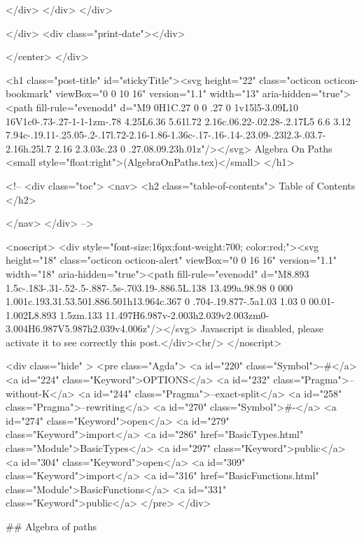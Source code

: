                 </div>
            </div>
          </div>
          
          
        </div>
        <div class="print-date"></div>
        
        
    </center>
  </div>

  

  <h1 class="post-title" id="stickyTitle"><svg height="22" class="octicon octicon-bookmark" viewBox="0 0 10 16" version="1.1" width="13" aria-hidden="true"><path fill-rule="evenodd" d="M9 0H1C.27 0 0 .27 0 1v15l5-3.09L10 16V1c0-.73-.27-1-1-1zm-.78 4.25L6.36 5.61l.72 2.16c.06.22-.02.28-.2.17L5 6.6 3.12 7.94c-.19.11-.25.05-.2-.17l.72-2.16-1.86-1.36c-.17-.16-.14-.23.09-.23l2.3-.03.7-2.16h.25l.7 2.16 2.3.03c.23 0 .27.08.09.23h.01z"/></svg> Algebra On Paths <small style="float:right">(AlgebraOnPaths.tex)</small>
  </h1>

  <!-- 
  <div class="toc">
    <nav>
    <h2 class="table-of-contents"> Table of Contents </h2>
      

    </nav>
  </div>
   -->

  <noscript>
  <div style="font-size:16px;font-weight:700; color:red;"><svg height="18" class="octicon octicon-alert" viewBox="0 0 16 16" version="1.1" width="18" aria-hidden="true"><path fill-rule="evenodd" d="M8.893 1.5c-.183-.31-.52-.5-.887-.5s-.703.19-.886.5L.138 13.499a.98.98 0 000 1.001c.193.31.53.501.886.501h13.964c.367 0 .704-.19.877-.5a1.03 1.03 0 00.01-1.002L8.893 1.5zm.133 11.497H6.987v-2.003h2.039v2.003zm0-3.004H6.987V5.987h2.039v4.006z"/></svg> Javascript is disabled, please activate it to see correctly this post.</div><br/>
  </noscript>

  <div class="hide" >
<pre class="Agda">
<a id="220" class="Symbol">{-#</a> <a id="224" class="Keyword">OPTIONS</a> <a id="232" class="Pragma">--without-K</a> <a id="244" class="Pragma">--exact-split</a> <a id="258" class="Pragma">--rewriting</a> <a id="270" class="Symbol">#-}</a>
<a id="274" class="Keyword">open</a> <a id="279" class="Keyword">import</a> <a id="286" href="BasicTypes.html" class="Module">BasicTypes</a> <a id="297" class="Keyword">public</a>
<a id="304" class="Keyword">open</a> <a id="309" class="Keyword">import</a> <a id="316" href="BasicFunctions.html" class="Module">BasicFunctions</a> <a id="331" class="Keyword">public</a>
</pre>
</div>

## Algebra of paths

